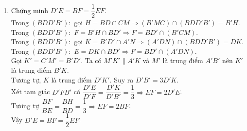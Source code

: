 \begin{bt}
\begin{bt}
{\begin{enumerate}
{\begin{tikzpicture}[scale=1, font=\footnotesize, line join=round, line cap=round, >=stealth]
				\end{tikzpicture}
			}
			\item Chứng minh $D'E=BF=\dfrac{1}{2}EF$.\\
			Trong $(BDD'B')\colon$ gọi $H=BD\cap CM\Rightarrow (B'MC)\cap (BDD'B')=B'H$.\\
			Trong $(BDD'B')\colon$ $F=B'H\cap BD'\Rightarrow F=BD'\cap (B'CM)$.\\
			Trong $(BDD'B')\colon$ gọi $K=B'D'\cap A'N\Rightarrow (A'DN)\cap (BDD'B')=DK$.\\
			Trong $(BDD'B')\colon$ $E=DK\cap BD'\Rightarrow F=BD'\cap (A'DN)$.\\
			Gọi $K'=C'M'=B'D'$. Ta có $M'K'\parallel A'K$ và $M'$ là trung điểm $A'B'$ nên $K'$ là trung điểm $B'K$.\\
			Tương tự, $K$ là trung điểm $D'K'$. Suy ra $D'B'=3D'K$.\\
			Xét tam giác $D'FB'$ có $\dfrac{D'E}{D'F}=\dfrac{D'K}{D'B'}=\dfrac{1}{3}\Rightarrow EF=2D'E$.\\
			Tương tự $\dfrac{BF}{BE}=\dfrac{BH}{BD}=\dfrac{1}{3}\Rightarrow EF=2BF$.\\
			Vậy $D'E=BF=\dfrac{1}{2}EF$.
		\end{enumerate}
	}
\end{bt}


\end{bt}
